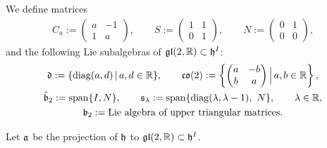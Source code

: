 \documentclass[11pt]{article}
\numberwithin{equation}{section}
\newcommand\fh{{\frak h}}
\newcommand\fa{{\frak a}}
\newcommand\fb{{\frak b}}
\newcommand\fd{{\frak d}}
\newcommand\fs{{\frak s}}
\newcommand{\fgl}{\mathop{{\frak g \frak l}}}
\newcommand{\fco}{\mathop{{\frak c \frak o}}}
\newcommand\RR{{\mathbb R}}
\newcommand{\Span}{\operatorname{span}}
\newcommand{\diag}{\operatorname{diag}}
\begin{document}
We define matrices
\begin{gather*}C_a:=\left(\begin{matrix} a&-1\\1&a\end{matrix}\right),\qquad S:=\left(\begin{matrix} 1&1\\0&1\end{matrix}\right),\qquad N:=\left(\begin{matrix} 0&1\\0&0\end{matrix}\right),
\end{gather*}
and the following Lie subalgebras of $\fgl(2,\RR)\subset \fh^I$:
\begin{gather*}
\fd := \{\diag(a,d)\,|\, a,d\in\RR\},\qquad
\fco(2) := \left\{ \left(\begin{matrix} a&-b\\b&a\end{matrix}\right) \Big| \, a,b\in\RR\right\},\\
\hat\fb_2 := \Span\{ I,N\},\qquad
\fs_\lambda := \Span \{\diag(\lambda, \lambda-1),\ N\},\qquad \lambda\in\RR,\\
\fb_2 := \text{Lie algebra of upper triangular matrices}.
\end{gather*}

Let $\fa$ be the projection of $\fh$ to $\fgl(2,\RR)\subset \fh^I$.
\end{document}
